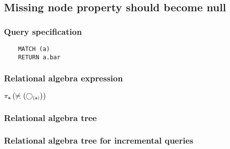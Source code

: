 	\subsection{Missing node property should become null}

	\subsubsection*{Query specification}

	\begin{lstlisting}
	MATCH (a)
	RETURN a.bar
	\end{lstlisting}


	\subsubsection*{Relational algebra expression}

	$\projection{\var{a}} \left(\alldifferent{} \left(\getvertices{a}{}\right)\right)$

	\subsubsection*{Relational algebra tree}


	\subsubsection*{Relational algebra tree for incremental queries}

